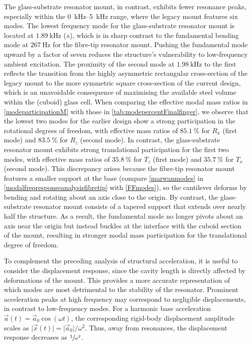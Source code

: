 \documentclass[../Thesis-IJspeert.tex]{subfiles}
\begin{document}
The glass-substrate resonator mount, in contrast, exhibits fewer resonance peaks, especially within the \SIrange{0}{5}{\kilo\hertz} range, where the legacy mount features six modes. The lowest frequency mode for the glass-substrate resonator mount is located at $\SI{1.89}{\kilo\hertz}$ \textsc{(a)}, which is in sharp contrast to the fundamental bending mode at $\SI{267}{\hertz}$ for the fibre-tip resonator mount. Pushing the fundamental mode upward by a factor of seven reduces the structure's vulnerability to low-frequency ambient excitation. The proximity of the second mode at $\SI{1.98}{\kilo\hertz}$ to the first reflects the transition from the highly asymmetric rectangular cross-section of the legacy mount to the more symmetric square cross-section of the current design, which is an unavoidable consequence of maximising the available steel volume within the (cuboid) glass cell. When comparing the effective modal mass ratios in \autoref{modeparticipationM} with those in \autoref{tab:modepercentFinalfinger}, we observe that the lowest two modes for the earlier design show a strong participation in the rotational degrees of freedom, with effective mass ratios of $\SI{85.1}{\percent}$ for $R_x$ (first mode) and $\SI{83.5}{\percent}$ for $R_z$ (second mode). In contrast, the glass-substrate resonator mount exhibits strong translational participation for the first two modes, with effective mass ratios of $\SI{35.8}{\percent}$ for $T_z$ (first mode) and $\SI{35.7}{\percent}$ for $T_x$ (second mode). This discrepancy arises because the fibre-tip resonator mount features a smaller support at the base (compare \autoref{marwanmodes} in \autoref{modalfreqresponseanalysisfibretip} with \autoref{FFmodes}), so the cantilever deforms by bending and rotating about an axis close to the origin. By contrast, the glass-substrate resonator mount consists of a tapered support that extends over nearly half the structure. As a result, the fundamental mode no longer pivots about an axis near the origin but instead buckles at the interface with the cuboid section of the mount, resulting in stronger modal mass participation for the translational degree of freedom.

To complement the preceding analysis of structural acceleration, it is useful to consider the displacement response, since the cavity length is directly affected by deformations of the mount. This provides a more accurate representation of which modes are most detrimental to the stability of the resonator. Prominent acceleration peaks at high frequency may correspond to negligible displacements, in contrast to low-frequency modes. For a harmonic base acceleration $\vec{a}(t) = \vec{a}_0 \cos(\omega t)$, the corresponding rigid-body displacement amplitude scales as $\lvert \vec{x}(t) \rvert = \lvert \vec{a}_0 \rvert / \omega^2$. Thus, away from resonances, the displacement response decreases as $\sfrac{1}{\omega^2}$. 
\end{document}
